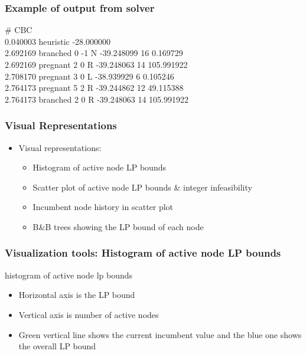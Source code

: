 \documentclass{beamer}
\begin{document}
\begin{frame}
\frametitle{Example of output from solver}

\# CBC\\
0.040003 heuristic -28.000000\\
2.692169 branched 0 -1 N -39.248099 16 0.169729\\
2.692169 pregnant 2 0 R -39.248063 14 105.991922\\
2.708170 pregnant 3 0 L -38.939929 6 0.105246\\
2.764173 pregnant 5 2 R -39.244862 12 49.115388\\
2.764173 branched 2 0 R -39.248063 14 105.991922\\
\end{frame}

\begin{frame}
\frametitle{Visual Representations}

\begin{itemize}
\item Visual representations:
    \begin{itemize}[<+->]    
    \item Histogram of active node LP bounds
    \item Scatter plot of active node LP bounds \& integer infeasibility
    \item Incumbent node history in scatter plot
    \item B\&B trees showing the LP bound of each node
    \end{itemize}
\end{itemize}
\end{frame}

\begin{frame}
\frametitle{Visualization tools: Histogram of active node LP bounds}

\begin{center}
histogram of active node lp bounds
\end{center}

\begin{itemize}
\item Horizontal axis is the LP bound
\item Vertical axis is number of active nodes
\item Green vertical line shows the current incumbent value and the blue one
shows the overall LP bound
\end{itemize}
\end{frame}
\end{document}
